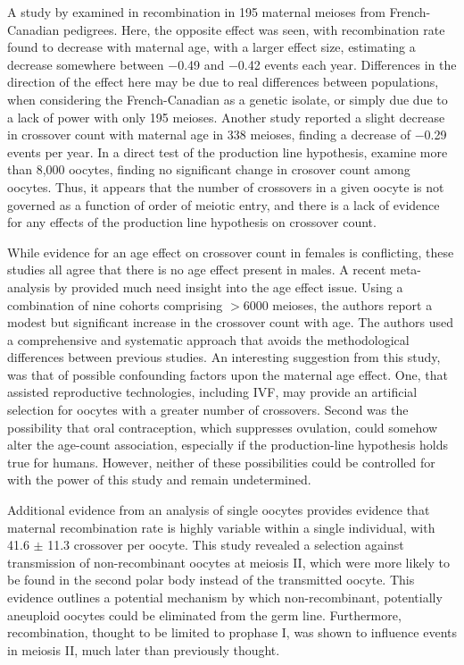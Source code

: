 A study by \citet{Hussin2011} examined in recombination in 195 maternal meioses from French-Canadian pedigrees.
Here, the opposite effect was seen, with recombination rate found to decrease with maternal age, with a larger effect size, estimating a decrease somewhere between $-$0.49 and $-$0.42 events each year.
Differences in the direction of the effect here may be due to real differences between populations, when considering the French-Canadian as a genetic isolate, or simply due due to a lack of power with only 195 meioses.
Another study reported a slight decrease in crossover count with maternal age in 338 meioses, finding a decrease of $-$0.29 events per year\cite{Bleazard2013}.
In a direct test of the production line hypothesis, \citet{Rowsey2014} examine more than 8,000 oocytes, finding no significant change in crosover count among oocytes.
Thus, it appears that the number of crossovers in a given oocyte is not governed as a function of order of meiotic entry, and there is a lack of evidence for any effects of the production line hypothesis on crossover count.

While evidence for an age effect on crossover count in females is conflicting, these studies all agree that there is no age effect present in males.
A recent meta-analysis by \citet{Martin2015} provided much need insight into the age effect issue.
Using a combination of nine cohorts comprising $>$6000 meioses, the authors report a modest but significant increase in the crossover count with age.
The authors used a comprehensive and systematic approach that avoids the methodological differences between previous studies.
An interesting suggestion from this study, was that of possible confounding factors upon the maternal age effect.
One, that assisted reproductive technologies, including IVF, may provide an artificial selection for oocytes with a greater number of crossovers.
Second was the possibility that oral contraception, which suppresses ovulation, could somehow alter the age-count association, especially if the production-line hypothesis holds true for humans.
However, neither of these possibilities could be controlled for with the power of this study and remain undetermined.


Additional evidence from an analysis of single oocytes provides evidence that maternal recombination rate is highly variable within a single individual, with 41.6 $\pm$ 11.3 crossover per oocyte\cite{Ottolini2015}.
This study revealed a selection against transmission of non-recombinant oocytes at meiosis II, which were more likely to be found in the second polar body instead of the transmitted oocyte.
This evidence outlines a potential mechanism by which non-recombinant, potentially aneuploid oocytes could be eliminated from the germ line.
Furthermore, recombination, thought to be limited to prophase I, was shown to influence events in meiosis II, much later than previously thought.

